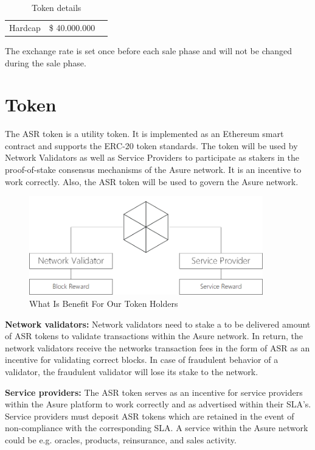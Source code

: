 \begin{table}[H]
\begin{tabular}{lp{}l}
  
  Hardcap & \$ 40.000.000
  
\end{tabular}
\caption{\label{tab:table-name}Token details}
\end{table}

The exchange rate is set once before each sale phase and will not be changed during the sale phase.

\section{Token}

The ASR token is a utility token. It is implemented as an Ethereum smart contract and supports the ERC-20 token standards. The token will be used by Network Validators as well as Service Providers to participate as stakers in the proof-of-stake consensus mechanisms of the Asure network. It is an incentive to work correctly. Also, the ASR token will be used to govern the Asure network.

\begin{figure}[H]
    \centering
    \includegraphics[width=4.0in]{img/staking.png}
    \caption{What Is Benefit For Our Token Holders}
    \label{fig:asure_architecture}
\end{figure}

\textbf{Network validators:}
Network validators need to stake a to be delivered amount of ASR tokens to validate transactions within the Asure network. In return, the network validators receive the networks transaction fees in the form of ASR as an incentive for validating correct blocks. In case of fraudulent behavior of a validator, the fraudulent validator will lose its stake to the network.

\textbf{Service providers:}
The ASR token serves as an incentive for service providers within the Asure platform to work correctly and as advertised within their SLA’s. Service providers must deposit ASR tokens which are retained in the event of non-compliance with the corresponding SLA. A service within the Asure network could be e.g. oracles, products, reinsurance, and sales activity.\newline

